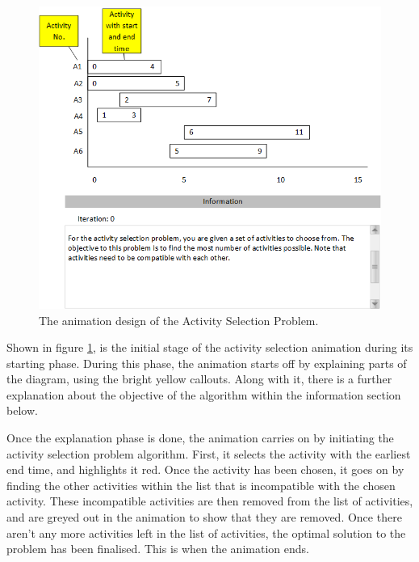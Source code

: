 \begin{figure}[H]
\centering
\includegraphics[scale=0.9]{images/report_images/animationDesignActivitySelectionProblem.png}
\caption{The animation design of the Activity Selection Problem.}
\label{animationDesignActivitySelectionProblem}
\end{figure}

Shown in figure \ref{animationDesignActivitySelectionProblem}, is the initial stage of the activity selection animation during its starting phase. During this phase, the animation starts off by explaining parts of the diagram, using the bright yellow callouts. Along with it, there is a further explanation about the objective of the algorithm within the information section below.

Once the explanation phase is done, the animation carries on by initiating the activity selection problem algorithm. First, it selects the activity with the earliest end time, and highlights it red. Once the activity has been chosen, it goes on by finding the other activities within the list that is incompatible with the chosen activity. These incompatible activities are then removed from the list of activities, and are greyed out in the animation to show that they are removed. Once there aren't any more activities left in the list of activities, the optimal solution to the problem has been finalised. This is when the animation ends. 

